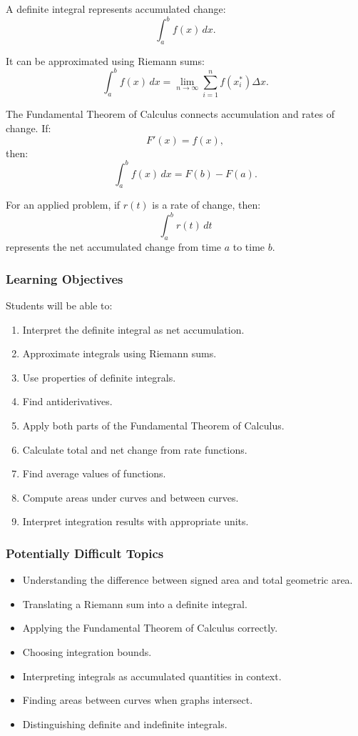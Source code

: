 \documentclass[11pt]{article}
\begin{document}
A definite integral represents accumulated change:
\[
\int_a^b f(x)\,dx.
\]

It can be approximated using Riemann sums:
\[
\int_a^b f(x)\,dx
=
\lim_{n\to \infty}
\sum_{i=1}^{n}f(x_i^*)\Delta x.
\]

The Fundamental Theorem of Calculus connects accumulation and rates of change. If:
\[
F'(x)=f(x),
\]
then:
\[
\int_a^b f(x)\,dx=F(b)-F(a).
\]

For an applied problem, if \(r(t)\) is a rate of change, then:
\[
\int_a^b r(t)\,dt
\]
represents the net accumulated change from time \(a\) to time \(b\).

\subsubsection*{Learning Objectives}

Students will be able to:

\begin{enumerate}[label=\arabic*.]
    \item Interpret the definite integral as net accumulation.
    \item Approximate integrals using Riemann sums.
    \item Use properties of definite integrals.
    \item Find antiderivatives.
    \item Apply both parts of the Fundamental Theorem of Calculus.
    \item Calculate total and net change from rate functions.
    \item Find average values of functions.
    \item Compute areas under curves and between curves.
    \item Interpret integration results with appropriate units.
\end{enumerate}

\subsubsection*{Potentially Difficult Topics}

\begin{itemize}
    \item Understanding the difference between signed area and total geometric area.
    \item Translating a Riemann sum into a definite integral.
    \item Applying the Fundamental Theorem of Calculus correctly.
    \item Choosing integration bounds.
    \item Interpreting integrals as accumulated quantities in context.
    \item Finding areas between curves when graphs intersect.
    \item Distinguishing definite and indefinite integrals.
\end{itemize}
\end{document}

